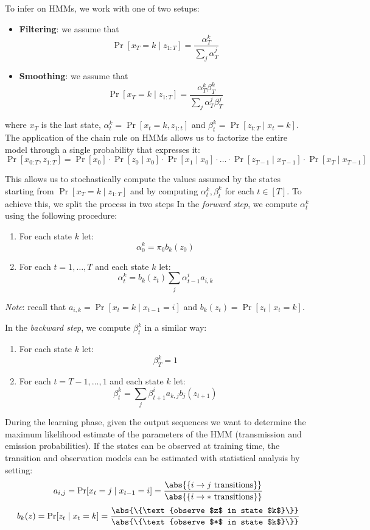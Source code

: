 \documentclass[a4paper, 12pt]{report}
\begin{document}
    To infer on HMMs, we work with one of two setups:
    \begin{itemize}
        \item \textbf{Filtering}: we assume that
        \[\Pr[x_T = k \mid z_{1:T}] = \frac{\alpha_T^k}{\sum_{j} \alpha_T^j}\]
        \item \textbf{Smoothing}: we assume that
        \[\Pr[x_T = k \mid z_{1:T}] = \frac{\alpha_T^k \beta_T^k}{\sum_{j} \alpha_T^j \beta_T^j}\]
    \end{itemize}
    where $x_T$ is the last state, $\alpha_t^k = \Pr[x_t = k, z_{1:t}]$ and $\beta_t^k = \Pr[z_{t:T} \mid x_t = k]$. The application of the chain rule on HMMs allows us to factorize the entire model through a single probability that expresses it:
    \[\Pr[x_{0:T}, z_{1:T}] = \Pr[x_0] \cdot \Pr[z_0 \mid x_0] \cdot \Pr[x_1 \mid x_0] \cdot \ldots \cdot \Pr[z_{T-1} \mid x_{T-1}] \cdot \Pr[x_T \mid x_{T-1}]\]

    This allows us to stochastically compute the values assumed by the states starting from $\Pr[x_T = k \mid z_{1:T}]$ and by computing $\alpha_t^k, \beta_t^k$ for each $t \in [T]$. To achieve this, we split the process in two steps In the \textit{forward step}, we compute $\alpha_t^k$ using the following procedure:
    \begin{enumerate}
        \item For each state $k$ let:
        \[\alpha_0^k = \pi_0 b_k(z_0)\]
        \item For each $t = 1, \ldots, T$ and each state $k$ let:
        \[\alpha_t^k = b_k(z_t) \sum_{j} \alpha^i_{t-1} a_{i,k}\]
    \end{enumerate}

    \textit{Note}: recall that $a_{i,k} = \Pr[x_t = k \mid x_{t-1} = i]$ and $b_k(z_t) = \Pr[z_t \mid x_t = k]$.
    
    In the \textit{backward step}, we compute $\beta_t^k$ in a similar way:
    \begin{enumerate}
        \item For each state $k$ let:
        \[\beta_T^k = 1\]
        \item For each $t = T-1, \ldots, 1$ and each state $k$ let:
        \[\beta_t^k = \sum_{j} \beta^i_{t+1} a_{k,j} b_j(z_{t+1}) \]
    \end{enumerate}

    During the learning phase, given the output sequences we want to determine the maximum likelihood estimate of the parameters of the HMM (transmission and emission probabilities). If the states can be observed at training time, the transition and observation models can be estimated with statistical analysis by setting:
    \[a_{i,j} = \Pr[x_t = j \mid x_{t-1} = i] = \frac{\abs{\{i \to j \text{ transitions}\}}}{\abs{\{i \to * \text{ transitions}\}}}\]
    \[b_k(z) =  \Pr[z_t \mid x_t = k] = \frac{\abs{\{\text{observe $z$ in state $k$}\}}}{\abs{\{\text{observe $*$ in state $k$}\}}}\]
\end{document}

